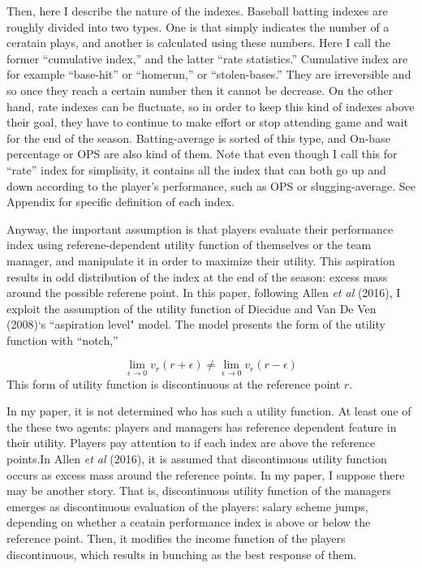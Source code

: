 \documentclass[dvipdfmx, 12pt]{article}
\begin{document}
Then, here I describe the nature of the indexes. Baseball batting indexes are roughly divided into two types. One is that simply indicates the number of a ceratain plays, and another is calculated using these numbers. Here I call the former ``cumulative index,'' and the latter ``rate statistics.'' Cumulative index are for example ``base-hit'' or ``homerun,'' or ``stolen-bases.'' They are irreversible and so once they reach a certain number then it cannot be decrease. On the other hand, rate indexes can be fluctuate, so in order to keep this kind of indexes above their goal, they have to continue to make effort or stop attending game and wait for the end of the season. Batting-average is sorted of this type, and On-base percentage or OPS are also kind of them. Note that even though I call this for ``rate'' index for simplisity, it contains all the index that can both go up and down according to the player's performance, such as OPS or slugging-average. See Appendix for specific definition of each index.

Anyway, the important assumption is that players evaluate their performance index using referene-dependent utility function of themselves or the team manager, and manipulate it in order to maximize their utility. This aspiration results in odd distribution of the index at the end of the season: excess mass around the possible referene point. In this paper, following Allen \textit{et al} (2016), I exploit the assumption of the utility function of Diecidue and Van De Ven (2008)`s ``aspiration level" model. The model presents the form of the utility function with ``notch,''

\[
\lim_{\epsilon \to 0} v_r (r + \epsilon) \neq
\lim_{\epsilon \to 0} v_r (r - \epsilon)
\]
This form of utility function is discontinuous at the reference point $r$.

In my paper, it is not determined who has such a utility function. At least one of the these two agents: players and managers has reference dependent feature in their utility. Players pay attention to if each index are above the reference points.In  Allen \textit{et al} (2016), it is assumed that discontinuous utility function occurs as excess mass around the reference points. In my paper, I suppose there may be another story. That is, discontinuous utility function of the managers emerges as discontinuous evaluation of the players: salary scheme jumps, depending on whether a ceatain performance index is above or below the reference point. Then, it modifies the income function of the players discontinuous, which results in bunching as the best response of them.
\end{document}
